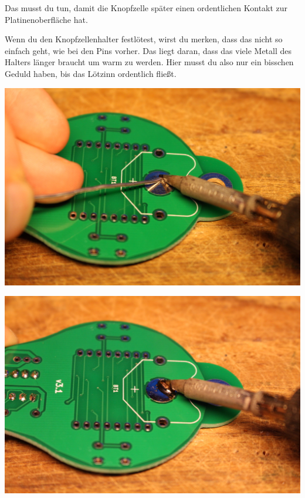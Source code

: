 \documentclass{article}
\begin{document}
Das musst du tun, damit die Knopfzelle später einen ordentlichen Kontakt zur Platinenoberfläche hat.

Wenn du den Knopfzellenhalter festlötest, wirst du merken, dass das nicht so einfach geht, wie bei den Pins vorher. Das liegt daran, dass das viele Metall des Halters länger braucht um warm zu werden. Hier musst du also nur ein bisschen Geduld haben, bis das Lötzinn ordentlich fließt.

\vspace{1cm}

\begin{minipage}[b]{0.5\textwidth}
	\includegraphics[width=\textwidth]{Bilder2021/IMG_8139.JPG}
\end{minipage}
\begin{minipage}[b]{0.5\textwidth}
	\includegraphics[width=\textwidth]{Bilder2021/IMG_8140.JPG}
\end{minipage}
\end{document}
